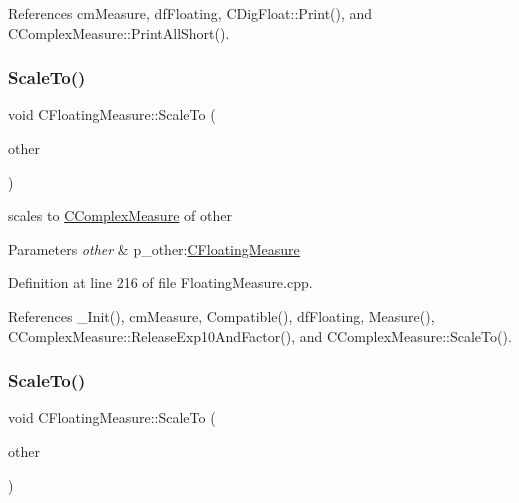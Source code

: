 References cm\+Measure, df\+Floating, C\+Dig\+Float\+::\+Print(), and C\+Complex\+Measure\+::\+Print\+All\+Short().

\mbox{\label{classCFloatingMeasure_aa0a16f8516d047576b588389504c0996}} 
\subsubsection{\texorpdfstring{Scale\+To()}{ScaleTo()}\hspace{0.1cm}{\footnotesize\ttfamily [1/2]}}
{\footnotesize\ttfamily void C\+Floating\+Measure\+::\+Scale\+To (\begin{DoxyParamCaption}\item[{const \hyperlink{classCFloatingMeasure}{C\+Floating\+Measure} \&}]{other }\end{DoxyParamCaption})}



scales to \hyperlink{classCComplexMeasure}{C\+Complex\+Measure} of other 


\begin{DoxyParams}{Parameters}
{\em other} & p\+\_\+other\+:\hyperlink{classCFloatingMeasure}{C\+Floating\+Measure} \\
\hline
\end{DoxyParams}


Definition at line 216 of file Floating\+Measure.\+cpp.



References \+\_\+\+Init(), cm\+Measure, Compatible(), df\+Floating, Measure(), C\+Complex\+Measure\+::\+Release\+Exp10\+And\+Factor(), and C\+Complex\+Measure\+::\+Scale\+To().

\mbox{\label{classCFloatingMeasure_a841b94d2883274e67999688fad40d538}} 
\subsubsection{\texorpdfstring{Scale\+To()}{ScaleTo()}\hspace{0.1cm}{\footnotesize\ttfamily [2/2]}}
{\footnotesize\ttfamily void C\+Floating\+Measure\+::\+Scale\+To (\begin{DoxyParamCaption}\item[{const \hyperlink{classCComplexMeasure}{C\+Complex\+Measure} \&}]{other }\end{DoxyParamCaption})}



